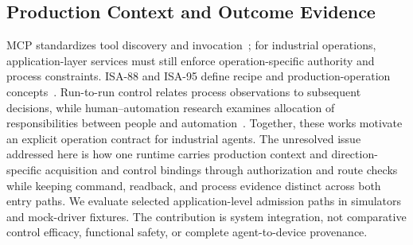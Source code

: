 \subsection{Production Context and Outcome Evidence}
MCP standardizes tool discovery and invocation~\cite{mcp2026}; for industrial operations, application-layer services must still enforce operation-specific authority and process constraints. ISA-88 and ISA-95 define recipe and production-operation concepts~\cite{isa88_2010,isa95_2025}. Run-to-run control relates process observations to subsequent decisions, while human--automation research examines allocation of responsibilities between people and automation~\cite{moyne2001r2r,parasuraman2000model}. Together, these works motivate an explicit operation contract for industrial agents. The unresolved issue addressed here is how one runtime carries production context and direction-specific acquisition and control bindings through authorization and route checks while keeping command, readback, and process evidence distinct across both entry paths. We evaluate selected application-level admission paths in simulators and mock-driver fixtures. The contribution is system integration, not comparative control efficacy, functional safety, or complete agent-to-device provenance.
